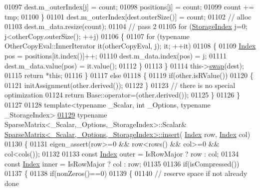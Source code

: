 \begin{DoxyCode}
01097       dest.m\_outerIndex[j] = count;
01098       positions[j] = count;
01099       count += tmp;
01100     \}
01101     dest.m\_outerIndex[dest.outerSize()] = count;
01102     \textcolor{comment}{// alloc}
01103     dest.m\_data.resize(count);
01104     \textcolor{comment}{// pass 2}
01105     \textcolor{keywordflow}{for} (\hyperlink{group___sparse_core___module_a0b540ba724726ebe953f8c0df06081ed}{StorageIndex} j=0; j<otherCopy.outerSize(); ++j)
01106     \{
01107       \textcolor{keywordflow}{for} (\textcolor{keyword}{typename} OtherCopyEval::InnerIterator it(otherCopyEval, j); it; ++it)
01108       \{
01109         \hyperlink{group___core___module_a554f30542cc2316add4b1ea0a492ff02}{Index} pos = positions[it.index()]++;
01110         dest.m\_data.index(pos) = j;
01111         dest.m\_data.value(pos) = it.value();
01112       \}
01113     \}
01114     this->\hyperlink{endian_8c_a3ca5ecd34b04d6a243c054ac3a57f68d}{swap}(dest);
01115     \textcolor{keywordflow}{return} *\textcolor{keyword}{this};
01116   \}
01117   \textcolor{keywordflow}{else}
01118   \{
01119     \textcolor{keywordflow}{if}(other.isRValue())
01120     \{
01121       initAssignment(other.derived());
01122     \}
01123     \textcolor{comment}{// there is no special optimization}
01124     \textcolor{keywordflow}{return} Base::operator=(other.derived());
01125   \}
01126 \}
01127 
01128 \textcolor{keyword}{template}<\textcolor{keyword}{typename} \_Scalar, \textcolor{keywordtype}{int} \_Options, \textcolor{keyword}{typename} \_StorageIndex>
\hyperlink{group___sparse_core___module_aae45e3b5fec7f6a0cdd10eec7c6d3666}{01129} \textcolor{keyword}{typename} SparseMatrix<\_Scalar,\_Options,\_StorageIndex>::Scalar& 
      \hyperlink{group___sparse_core___module_aae45e3b5fec7f6a0cdd10eec7c6d3666}{SparseMatrix<\_Scalar,\_Options,\_StorageIndex>::insert}(
      \hyperlink{group___core___module_a554f30542cc2316add4b1ea0a492ff02}{Index} row, \hyperlink{group___core___module_a554f30542cc2316add4b1ea0a492ff02}{Index} col)
01130 \{
01131   eigen\_assert(row>=0 && row<rows() && col>=0 && col<cols());
01132   
01133   \textcolor{keyword}{const} \hyperlink{group___core___module_a554f30542cc2316add4b1ea0a492ff02}{Index} outer = IsRowMajor ? row : col;
01134   \textcolor{keyword}{const} \hyperlink{group___core___module_a554f30542cc2316add4b1ea0a492ff02}{Index} inner = IsRowMajor ? col : row;
01135   
01136   \textcolor{keywordflow}{if}(isCompressed())
01137   \{
01138     \textcolor{keywordflow}{if}(nonZeros()==0)
01139     \{
01140       \textcolor{comment}{// reserve space if not already done}

\end{DoxyCode}
